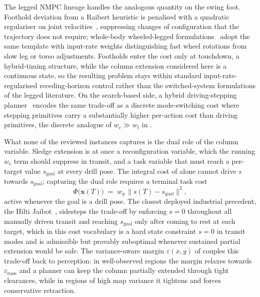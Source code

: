 \documentclass[11pt,a4paper]{article}
\begin{document}
The legged NMPC lineage handles the analogous quantity on the swing foot. Foothold deviation from a Raibert heuristic is penalised with a quadratic regulariser on joint velocities~\parencite{grandiaPerceptiveLocomotionNonlinear2022}, suppressing changes of configuration that the trajectory does not require; whole-body wheeled-legged formulations~\parencite{bjelonic2021wholebody,sleiman2021unified} adopt the same template with input-rate weights distinguishing fast wheel rotations from slow leg or torso adjustments. Footholds enter the cost only at touchdown, a hybrid-timing structure, while the column extension considered here is a continuous state, so the resulting problem stays within standard input-rate-regularised receding-horizon control rather than the switched-system formulations of the legged literature. On the search-based side, a hybrid driving-stepping planner~\parencite{klamtPlanningHybridDrivingStepping2018} encodes the same trade-off as a discrete mode-switching cost where stepping primitives carry a substantially higher per-action cost than driving primitives, the discrete analogue of $w_c \gg w_t$ in .

What none of the reviewed instances captures is the dual role of the column variable. Sledge extension is at once a reconfiguration variable, which the running $w_c$ term should suppress in transit, and a task variable that must reach a per-target value $s_{\text{goal}}$ at every drill pose. The integral cost of  alone cannot drive $s$ towards $s_{\text{goal}}$; capturing the dual role requires a terminal task cost
\begin{equation}
\Phi\bigl(\mathbf{x}(T)\bigr) \;=\; w_g \,\lVert s(T) - s_{\text{goal}} \rVert^2,
\label{eq:terminal_task_cost}
\end{equation}
active whenever the goal is a drill pose. The closest deployed industrial precedent, the Hilti Jaibot~\cite{hilti2020jaibot}, sidesteps the trade-off by enforcing $s = 0$ throughout all manually driven transit and reaching $s_{\text{goal}}$ only after coming to rest at each target, which in this cost vocabulary is a hard state constraint $s = 0$ in transit modes and is admissible but provably suboptimal whenever sustained partial extension would be safe. The variance-aware margin $\varepsilon(x,y)$ of  couples this trade-off back to perception: in well-observed regions the margin relaxes towards $\varepsilon_{\text{base}}$ and a planner can keep the column partially extended through tight clearances, while in regions of high map variance it tightens and forces conservative retraction.
\end{document}
